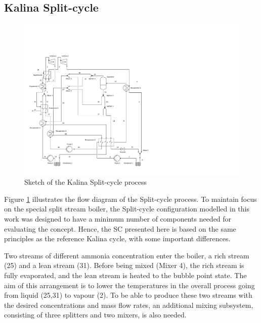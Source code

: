 \documentclass[final,times,5p]{elsarticle}
\begin{document}
\subsection{Kalina Split-cycle}
\label{sec:split_cycle}
\begin{figure}[htbp]
\centering
\includegraphics[width=1.0\linewidth]{Drawing_Kalina_Split.pdf}
\caption{Sketch of the Kalina Split-cycle process}
\label{fig:split_cycle}
\end{figure}

Figure \ref{fig:split_cycle} illustrates the flow diagram of the Split-cycle process. To maintain focus on the special split stream boiler, the Split-cycle configuration modelled in this work was designed to have a minimum number of components needed for evaluating the concept. Hence, the SC presented here is based on the same principles as the reference Kalina cycle, with some important differences. 

Two streams of different ammonia concentration enter the boiler, a rich stream (25) and a lean stream (31). Before being mixed (Mixer 4), the rich stream is fully evaporated, and the lean stream is heated to the bubble point state. The aim of this arrangement is to lower the temperatures in the overall process going from liquid (25,31) to vapour (2). To be able to produce these two streams with the desired concentrations and mass flow rates, an additional mixing subsystem, consisting of three splitters and two mixers, is also needed. 
\end{document}
